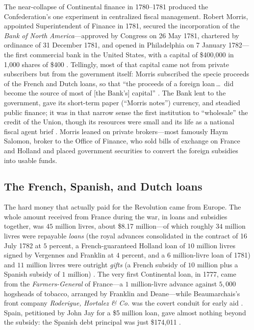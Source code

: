 \documentclass[12pt]{article}
\begin{document}
The near-collapse of Continental finance in 1780--1781 produced the
Confederation's one experiment in centralized fiscal management. Robert Morris,
appointed Superintendent of Finance in 1781, secured the incorporation of the
\emph{Bank of North America}---approved by Congress on 26 May 1781, chartered by
ordinance of 31 December 1781, and opened in Philadelphia on 7 January
1782---the first commercial bank in the United States, with a capital of
\$400,000 in 1{,}000 shares of \$400 \citep{rappleye2010robert}. Tellingly, most
of that capital came not from private subscribers but from the government
itself: Morris subscribed the specie proceeds of the French and Dutch loans, so
that ``the proceeds of a foreign loan\,\ldots\ did become the source of most of
[the Bank's] capital'' \citep[9]{sylla2011financial}. The Bank lent to the
government, gave its short-term paper (``Morris notes'') currency, and steadied
public finance; it was in that narrow sense the first institution to
``wholesale'' the credit of the Union, though its resources were small and its
life as a national fiscal agent brief \citep{ferguson1961power}. Morris leaned
on private brokers---most famously Haym Salomon, broker to the Office of Finance,
who sold bills of exchange on France and Holland and placed government
securities to convert the foreign subsidies into usable funds.

\subsection{The French, Spanish, and Dutch loans}

The hard money that actually paid for the Revolution came from Europe. The
whole amount received from France during the war, in loans and subsidies
together, was $45$ million livres, about \$8.17 million---of which roughly $34$
million livres were repayable \emph{loans} (the royal advances consolidated in
the contract of 16 July 1782 at $5$ percent, a French-guaranteed Holland loan of
$10$ million livres signed by Vergennes and Franklin at $4$ percent, and a $6$
million-livre loan of 1781) and $11$ million livres were outright \emph{gifts}
(a French subsidy of $10$ million plus a Spanish subsidy of $1$ million)
\citep[299--308]{bayley1881national}. The very first Continental loan, in 1777,
came from the \emph{Farmers-General} of France---a $1$ million-livre advance
against $5{,}000$ hogsheads of tobacco, arranged by Franklin and
Deane---while Beaumarchais's front company \emph{Roderigue, Hortalez \& Co.} was
the covert conduit for early aid \citep[304--305]{bayley1881national}. Spain,
petitioned by John Jay for a \$5 million loan, gave almost nothing beyond the
subsidy: the Spanish debt principal was just \$174{,}011
\citep[306]{bayley1881national}.
\end{document}
